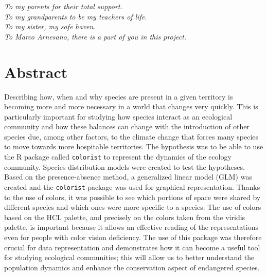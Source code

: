 \documentclass[12pt,a4paper]{article}
\begin{document}
\begin{titlepage}                      
%
\thispagestyle{empty}                   %
\topmargin=6.5cm                        %
\raggedleft                             %
\large                                  %
                                       
\em                                     %
To my parents for their total support.\\

To my grandparents to be my teachers of life.\\

To my sister, my safe haven.\\

To Marco Arnesano, there is a part of you in this project.\\

\newpage                                
\clearpage{\pagestyle{empty}\cleardoublepage}%
\end{titlepage}
\linespread{1.2} 
\newpage
\tableofcontents
\linespread{1.5} 
\newpage
\section{Abstract}
 Describing how, when and why species are present in a given territory is becoming more and more necessary in a world that changes very quickly.
This is particularly important for studying how species interact as an ecological community and how these balances can change with the introduction of other species due, among other factors, to the climate change that forces many species to move towards more hospitable territories.
The hypothesis was to be able to use the R package called \texttt{colorist} to represent the dynamics of the ecology community.
Species distribution models were created to test the hypotheses. Based on the presence-absence method, a generalized linear model (GLM) was created and the \texttt{colorist} package was used for graphical representation.
Thanks to the use of colors, it was possible to see which portions of space were shared by different species and which ones were more specific to a species.
The use of colors based on the HCL palette, and precisely on the colors taken from the viridis palette, is important because it allows an effective reading of the representations even for people with color vision deficiency.
The use of this package was therefore crucial for data representation and demonstrates how it can become a useful tool for studying ecological communities; this will allow us to better understand the population dynamics and enhance the conservation aspect of endangered species.
 
\end{document}

